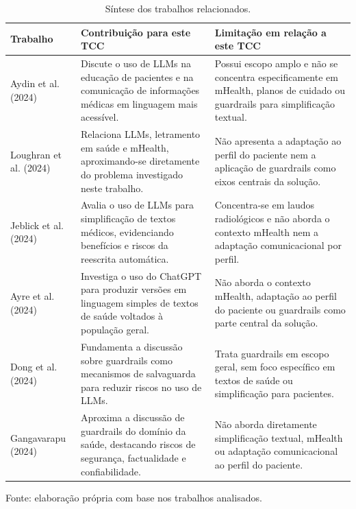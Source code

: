 \begin{table}[H]
\centering
\caption{Síntese dos trabalhos relacionados.}
\label{tab:comparacao-trabalhos-relacionados}
\footnotesize
\renewcommand{\arraystretch}{1.12}
\begin{tabularx}{\textwidth}{p{2.8cm} X X}
\toprule
\textbf{Trabalho} &
\textbf{Contribuição para este TCC} &
\textbf{Limitação em relação a este TCC} \\
\midrule

Aydin et al. (2024) &
Discute o uso de LLMs na educação de pacientes e na comunicação de informações médicas em linguagem mais acessível. &
Possui escopo amplo e não se concentra especificamente em mHealth, planos de cuidado ou guardrails para simplificação textual. \\

\addlinespace

Loughran et al. (2024) &
Relaciona LLMs, letramento em saúde e mHealth, aproximando-se diretamente do problema investigado neste trabalho. &
Não apresenta a adaptação ao perfil do paciente nem a aplicação de guardrails como eixos centrais da solução. \\

\addlinespace

Jeblick et al. (2024) &
Avalia o uso de LLMs para simplificação de textos médicos, evidenciando benefícios e riscos da reescrita automática. &
Concentra-se em laudos radiológicos e não aborda o contexto mHealth nem a adaptação comunicacional por perfil. \\

\addlinespace

Ayre et al. (2024) &
Investiga o uso do ChatGPT para produzir versões em linguagem simples de textos de saúde voltados à população geral. &
Não aborda o contexto mHealth, adaptação ao perfil do paciente ou guardrails como parte central da solução. \\

\addlinespace

Dong et al. (2024) &
Fundamenta a discussão sobre guardrails como mecanismos de salvaguarda para reduzir riscos no uso de LLMs. &
Trata guardrails em escopo geral, sem foco específico em textos de saúde ou simplificação para pacientes. \\

\addlinespace

Gangavarapu (2024) &
Aproxima a discussão de guardrails do domínio da saúde, destacando riscos de segurança, factualidade e confiabilidade. &
Não aborda diretamente simplificação textual, mHealth ou adaptação comunicacional ao perfil do paciente. \\

\bottomrule

\end{tabularx}

\vspace{0.15cm}
\footnotesize Fonte: elaboração própria com base nos trabalhos analisados.
\end{table}

